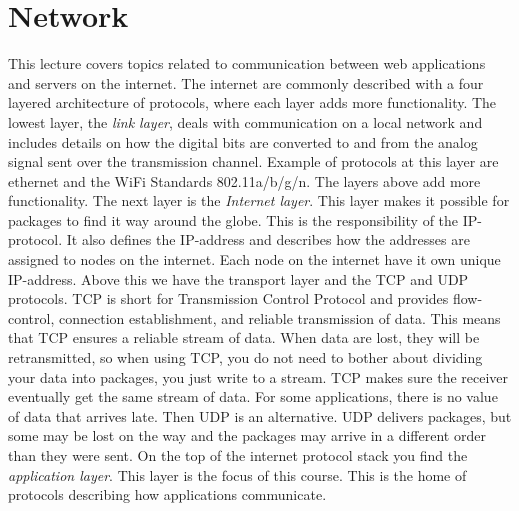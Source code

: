 
\chapter{Network} \label{chapter:network}
This lecture covers topics related to communication between web applications and servers on the internet. 
The internet are commonly described with a four layered architecture of protocols, where each layer adds more functionality. The lowest layer, the \emph{link layer}, deals with communication on a local network and includes details on how the digital bits are converted to and from the analog signal sent over the transmission channel. Example of protocols at this layer are ethernet and the WiFi Standards 802.11a/b/g/n. The layers above add more functionality. The next layer is the \emph{Internet layer}. This layer makes it possible for packages to find it way around the globe. This is the responsibility of the IP-protocol. It also defines the IP-address and describes how the addresses are assigned to nodes on the internet. Each node on the internet have it own unique IP-address. Above this we have the transport layer and the TCP and UDP protocols. TCP is short for Transmission Control Protocol and provides flow-control, connection establishment, and reliable transmission of data. This means that TCP ensures a reliable stream of data. When data are lost, they will be retransmitted, so when using TCP, you do not need to bother about dividing your data into packages, you just write to a stream. TCP makes sure the receiver eventually get the same stream of data. For some applications, there is no value of data that arrives late. Then UDP is an alternative. UDP delivers packages, but some may be lost on the way and the packages may arrive in a different order than they were sent. On the top of the internet protocol stack you find the \emph{application layer}. This layer is the focus of this course. This is the home of protocols describing how applications communicate.

